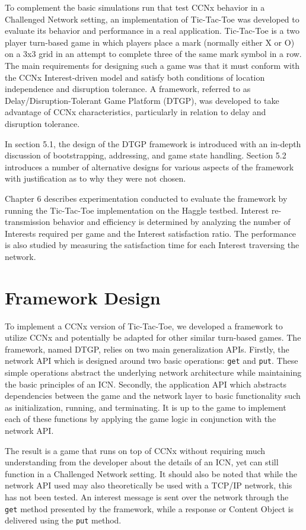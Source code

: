 \documentclass[a4paper,12pt]{report}      %
\begin{document}
To complement the basic simulations run that test CCNx behavior in a Challenged Network setting, an
implementation of Tic-Tac-Toe was developed to evaluate its behavior and performance in a real
application. Tic-Tac-Toe is a two player turn-based game in which players place a mark (normally either X or O)
 on a 3x3 grid in an attempt to complete three of the same mark symbol in a row. 
The main requirements for designing such a game was that it must conform with the
CCNx Interest-driven model and satisfy both conditions of location independence and disruption
tolerance. A framework, referred to as Delay/Disruption-Tolerant Game Platform (DTGP), was developed to take advantage of CCNx characteristics, 
particularly in relation to delay and disruption tolerance.

In section 5.1, the design of the DTGP framework is introduced with an in-depth discussion of bootstrapping,
addressing, and game state handling. Section 5.2 introduces a number of alternative designs for various aspects 
of the framework with justification as to why they were not chosen. 

Chapter 6 describes experimentation conducted to evaluate the framework by running the Tic-Tac-Toe implementation on the Haggle testbed. Interest re-transmission behavior and efficiency is determined by analyzing the number of Interests required per game and the Interest satisfaction ratio. The performance is also studied by measuring the satisfaction time for each Interest traversing the network.    

\section{Framework Design}

To implement a CCNx version of Tic-Tac-Toe, we developed a framework to utilize CCNx and potentially be adapted 
for other similar turn-based games. The framework, named DTGP, relies on two main generalization APIs.
Firstly, the network API which is designed around two basic operations: \verb!get! and \verb!put!. These simple
operations abstract the underlying network architecture while maintaining the basic principles of an
ICN. Secondly, the application API which abstracts dependencies between the game and the
network layer to basic functionality such as initialization, running, and terminating. It is up to the game
to implement each of these functions by applying the game logic in conjunction with the network API.

The result is a game that runs on top of CCNx without requiring much understanding from the
developer about the details of an ICN, yet can still function in a Challenged Network setting. It should
also be noted that while the network API used may also theoretically be used with a TCP/IP network,
this has not been tested. An interest message is sent over the network through the \verb!get! method presented
 by the framework, while  a response or Content Object is delivered using the \verb!put! method. 
\end{document}
